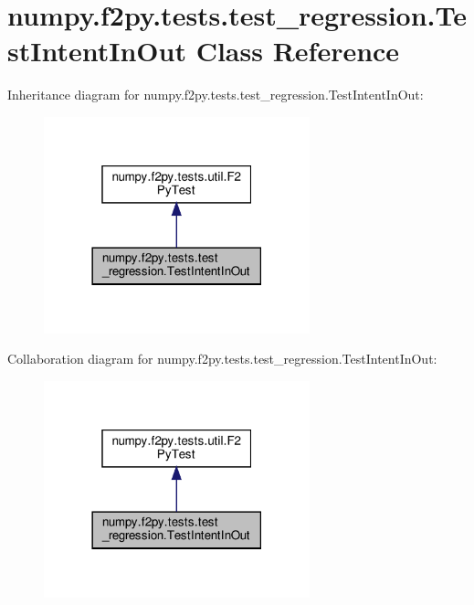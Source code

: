 \hypertarget{classnumpy_1_1f2py_1_1tests_1_1test__regression_1_1TestIntentInOut}{}\section{numpy.\+f2py.\+tests.\+test\+\_\+regression.\+Test\+Intent\+In\+Out Class Reference}
\label{classnumpy_1_1f2py_1_1tests_1_1test__regression_1_1TestIntentInOut}


Inheritance diagram for numpy.\+f2py.\+tests.\+test\+\_\+regression.\+Test\+Intent\+In\+Out\+:
\nopagebreak
\begin{figure}[H]
\begin{center}
\leavevmode
\includegraphics[width=218pt]{classnumpy_1_1f2py_1_1tests_1_1test__regression_1_1TestIntentInOut__inherit__graph}
\end{center}
\end{figure}


Collaboration diagram for numpy.\+f2py.\+tests.\+test\+\_\+regression.\+Test\+Intent\+In\+Out\+:
\nopagebreak
\begin{figure}[H]
\begin{center}
\leavevmode
\includegraphics[width=218pt]{classnumpy_1_1f2py_1_1tests_1_1test__regression_1_1TestIntentInOut__coll__graph}
\end{center}
\end{figure}
